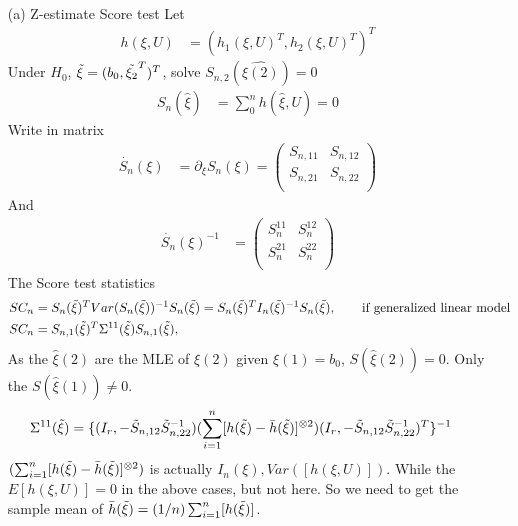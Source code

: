 \documentclass{article}
\begin{document}
\begin{itemize}
    \item [(a)] Z-estimate Score test
    Let 
\begin{align*}
    h(\xi, U) &= \left( h_1(\xi, U)^T,  h_2(\xi, U)^T\right)^T
\end{align*}
Under $H_0$, $\Tilde{\xi} = (b_0, \Tilde{\xi_2}^T)^T$, solve $S_{n,2}(\hat{\xi(2)}) = 0$
\begin{align*}
    S_n(\hat{\xi}) &= \sum_{0}^n h\left( \hat{\xi}, U\right) = 0
\end{align*}
Write in matrix
\begin{align*}
    \dot{S_n}(\xi) &= \partial_{\xi} S_n(\xi) =  \begin{pmatrix}
    S_{n,11}  & S_{n,12} \\
    S_{n,21} &  S_{n,22}  \\
    \end{pmatrix}
\end{align*}
And
\begin{align*}
 \dot{S_n}(\xi)^{-1} &= \begin{pmatrix}
           S_{n}^{11}  & S_{n}^{12} \\
            S_{n}^{21} &  S_{n}^{22}  \\
         \end{pmatrix}
\end{align*}
The Score test statistics
\begin{align*}
 SC_n &= S_{n}(\Tilde{\xi})^T Var(S_n(\Tilde{\xi}))^{-1} S_{n}(\Tilde{\xi})= S_{n}(\Tilde{\xi})^T I_n(\Tilde{\xi})^{-1} S_{n}(\Tilde{\xi}), \qquad \text{if generalized linear model}\\
 SC_n &= S_{n,1}(\Tilde{\xi})^T \Sigma^{11}(\Tilde{\xi}) S_{n,1}(\Tilde{\xi}) , 
\end{align*}
As the $\hat{\xi}(2)$ are the MLE of ${\xi}(2)$ given ${\xi}(1) = b_0$, $S(\hat{\xi}(2)) = 0$. Only the $S(\hat{\xi}(1)) \neq 0$.
\begin{align*}
\Sigma^{11}(\Tilde{\xi}) &= \{(I_r, -\Tilde{S}_{n,12}\Tilde{S}^{-1}_{n,22}) (\sum_{i=1}^n [h(\Tilde{\xi}) - \bar{h}(\Tilde{\xi})]^{\otimes 2}) (I_r, -\Tilde{S}_{n,12}\Tilde{S}^{-1}_{n,22})^T\}^{-1}
\end{align*}
$(\sum_{i=1}^n [h(\Tilde{\xi}) - \bar{h}(\Tilde{\xi})]^{\otimes 2})$ is actually $I_n(\xi), Var([h(\xi,U)])$. While the $E[h(\xi,U)] = 0$ in the above cases, but not here. So we need to get the sample mean of $\bar{h}(\Tilde{\xi}) = (1/n) \sum_{i=1}^n [h(\Tilde{\xi})]$. \\

\end{itemize}
\end{document}
